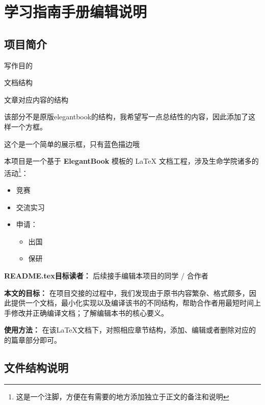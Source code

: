 


\chapter{学习指南手册编辑说明}
\section{项目简介}
\begin{introduction}
    \item 写作目的
    \item 文档结构
    \item 文章对应内容的结构
\end{introduction}

\begin{notebox}
    该部分不是原版elegantbook的结构，我希望写一点总结性的内容，因此添加了这样一个方框。
\end{notebox}

\begin{presentbox}
    这个是一个简单的展示框，只有蓝色描边哦~
\end{presentbox}
本项目是一个基于 \textbf{ElegantBook} 模板的 LaTeX 文档工程，涉及生命学院诸多的活动\footnote{这是一个注脚，方便在有需要的地方添加独立于正文的备注和说明}：
\begin{itemize}
  \item 竞赛
  \item 交流实习
  \item 申请：
  \begin{itemize}
      \item 出国
      \item 保研
  \end{itemize}
\end{itemize}

\textbf{README.tex目标读者：} 后续接手编辑本项目的同学 / 合作者 

\textbf{本文的目标：} 在项目交接的过程中，我们发现由于原书内容繁杂、格式颇多，因此提供一个文档，最小化实现以及编译该书的不同结构，帮助合作者用最短时间上手修改并正确编译文档；了解编辑本书的核心要义。

\textbf{使用方法：} 在该\LaTeX 文档下，对照相应章节结构，添加、编辑或者删除对应的的篇章部分即可。

\newpage

\section{文件结构说明}


